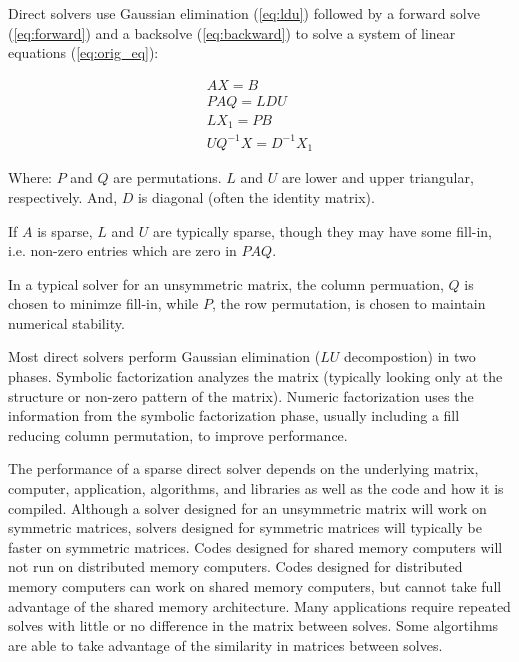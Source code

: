 \documentclass[acmtocl]{acmtrans2m}
\begin{document}
Direct solvers use Gaussian elimination (\ref{eq:ldu}) followed by a
forward solve (\ref{eq:forward}) and a backsolve (\ref{eq:backward})
to solve a system of linear equations (\ref{eq:orig_eq}):

\begin{eqnarray}
  \label{eq:orig_eq}
  A X = B \\ 
  \label{eq:ldu}
  PAQ = LDU \\
  \label{eq:forward}
  LX_1 = PB \\
  \label{eq:backward}
  UQ^{-1}X = D^{-1}X_1  
\end{eqnarray}

Where: $P$ and $Q$ are permutations.  $L$ and $U$ are lower and upper triangular, respectively.  And, $D$ is diagonal (often the identity matrix).  

If $A$ is sparse, $L$ and $U$
are typically sparse, though they may have some fill-in, i.e. non-zero entries which are zero in
$PAQ$.  

In a typical solver for an unsymmetric matrix, the column permuation,
$Q$ is chosen to minimze fill-in, while $P$, the row permutation, is
chosen to maintain numerical stability.  

Most direct solvers perform Gaussian elimination ($LU$ decompostion) in
two phases.  Symbolic factorization analyzes the matrix (typically
looking only at the structure or non-zero pattern of the matrix).
Numeric factorization uses the information from the symbolic
factorization phase, usually including a fill reducing column permutation, 
to improve performance.  

The performance of a sparse direct solver depends on the underlying
matrix, computer, application, algorithms, and libraries as well as
the code and how it is compiled.  Although a solver designed for an
unsymmetric matrix will work on symmetric matrices, solvers designed
for symmetric matrices will typically be faster on symmetric matrices.
Codes designed for shared memory computers will not run on distributed
memory computers.  Codes designed for distributed memory computers can
work on shared memory computers, but cannot take full advantage of the
shared memory architecture.  Many applications require repeated solves
with little or no difference in the matrix between solves.  Some
algortihms are able to take advantage of the similarity in matrices
between solves.
\end{document}
